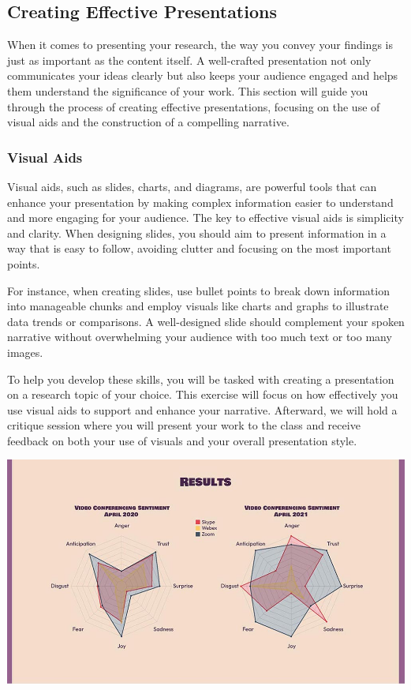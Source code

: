\documentclass[
]{book}
\begin{document}
\subsection{Creating Effective Presentations}\label{creating-effective-presentations}

When it comes to presenting your research, the way you convey your findings is just as important as the content itself. A well-crafted presentation not only communicates your ideas clearly but also keeps your audience engaged and helps them understand the significance of your work. This section will guide you through the process of creating effective presentations, focusing on the use of visual aids and the construction of a compelling narrative.

\subsubsection{Visual Aids}\label{visual-aids}

Visual aids, such as slides, charts, and diagrams, are powerful tools that can enhance your presentation by making complex information easier to understand and more engaging for your audience. The key to effective visual aids is simplicity and clarity. When designing slides, you should aim to present information in a way that is easy to follow, avoiding clutter and focusing on the most important points.

For instance, when creating slides, use bullet points to break down information into manageable chunks and employ visuals like charts and graphs to illustrate data trends or comparisons. A well-designed slide should complement your spoken narrative without overwhelming your audience with too much text or too many images.

To help you develop these skills, you will be tasked with creating a presentation on a research topic of your choice. This exercise will focus on how effectively you use visual aids to support and enhance your narrative. Afterward, we will hold a critique session where you will present your work to the class and receive feedback on both your use of visuals and your overall presentation style.

\includegraphics[width=1\textwidth,height=\textheight]{images/fig089.jpg}
\end{document}
